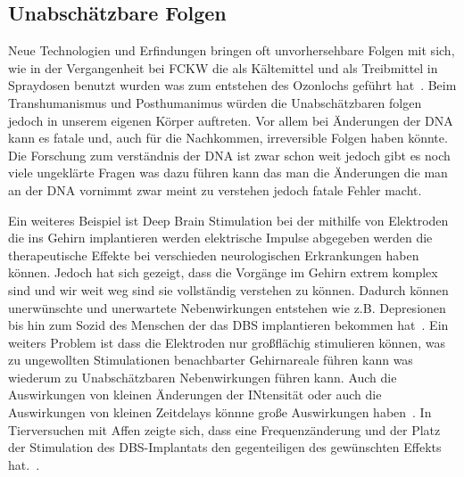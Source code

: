 \documentclass[a4paper,
DIV=13,
12pt,
BCOR=10mm,
department=FakEI,
twoside,
parskip=half,
automark,
]{OTHRartcl}
\begin{document}
\subsection*{Unabschätzbare Folgen}
Neue Technologien und Erfindungen bringen oft unvorhersehbare Folgen mit sich, wie in der Vergangenheit bei FCKW die als Kältemittel und als Treibmittel in Spraydosen benutzt wurden 
was zum entstehen des Ozonlochs  geführt hat~\cite{rowland1996stratospheric}. 
Beim Transhumanismus und Posthumanimus würden die Unabschätzbaren folgen jedoch in unserem eigenen Körper auftreten. Vor allem bei Änderungen der DNA kann es fatale und, auch für die 
Nachkommen, irreversible Folgen haben könnte. Die Forschung zum verständnis der DNA ist zwar schon weit jedoch gibt es noch viele ungeklärte Fragen was dazu führen kann das man die 
Änderungen die man an der DNA vornimmt zwar meint zu verstehen jedoch fatale Fehler macht.

Ein  weiteres Beispiel ist Deep Brain Stimulation bei der mithilfe von Elektroden die ins Gehirn implantieren werden elektrische Impulse abgegeben werden die therapeutische Effekte bei 
verschieden neurologischen Erkrankungen haben können. Jedoch hat sich gezeigt, dass die Vorgänge im Gehirn extrem komplex sind und wir weit weg sind sie vollständig verstehen zu können. 
Dadurch können unerwünschte und unerwartete Nebenwirkungen entstehen wie z.B. Depresionen bis hin zum Sozid des Menschen der das DBS implantieren bekommen hat~\cite{zarzycki2020stimulation}.  
Ein weiters Problem ist dass die Elektroden nur großflächig stimulieren können, was zu ungewollten Stimulationen benachbarter Gehirnareale führen kann was wiederum zu Unabschätzbaren Nebenwirkungen
führen kann. Auch die Auswirkungen von kleinen Änderungen der INtensität oder auch die Auswirkungen von kleinen Zeitdelays könnne große Auswirkungen haben~\cite{al2021impact}. In 
Tierversuchen mit Affen zeigte sich, dass eine Frequenzänderung und der Platz der Stimulation des DBS-Implantats den gegenteiligen des gewünschten Effekts hat.~\cite{logothetis2010effects}.
\end{document}
